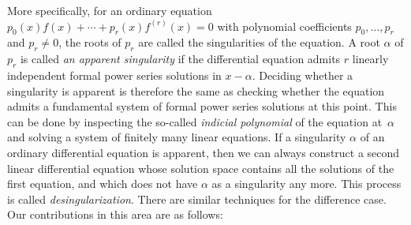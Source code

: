 \documentclass[10pt,a4paper]{article}
\begin{document}
More specifically, for an ordinary equation $p_0(x)f(x) + \cdots + p_r(x)f^{(r)}(x) = 0$ with
polynomial coefficients $p_0,\dots,p_r$ and $p_r\neq0$, the roots of $p_r$ are called the
singularities of the equation. A root $\alpha$ of $p_r$ is called \emph{an apparent singularity} if the
differential equation admits $r$ linearly independent formal power series solutions in 
$x - \alpha$. Deciding whether a singularity is apparent is therefore the same as
checking whether the equation admits a fundamental system of formal power series
solutions at this point. This can be done by inspecting the so-called
\emph{indicial polynomial} of the equation at~$\alpha$ and solving a system of finitely many linear equations. 
If a singularity $\alpha$ of an ordinary differential equation is apparent, then we can always 
construct a second linear differential equation whose solution space contains all the solutions of the
first equation, and which does not have $\alpha$ as a singularity any more. 
This process is called \emph{desingularization}.  There are similar techniques for the difference case. 
Our contributions in this area are as follows: 
\end{document}
